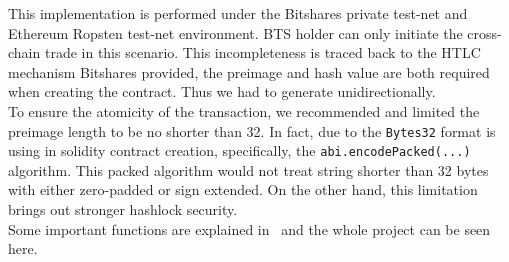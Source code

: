 \noindent This implementation is performed under the Bitshares private test-net and Ethereum Ropsten test-net environment. BTS holder can only initiate the cross-chain trade in this scenario. This incompleteness is traced back to the HTLC mechanism Bitshares provided, the preimage and hash value are both required when creating the contract. Thus we had to generate unidirectionally.\\

\noindent To ensure the atomicity of the transaction, we recommended and limited the preimage length to be no shorter than 32. In fact, due to the \texttt{Bytes32} format is using in solidity contract creation, specifically, the \texttt{abi.encodePacked(...)} algorithm\footnotemark[1]. This packed algorithm would not treat string shorter than 32 bytes with either zero-padded or sign extended. On the other hand, this limitation brings out stronger hashlock security.\\

\noindent Some important functions are explained in~ and the whole project can be seen here\footnotemark[2].

